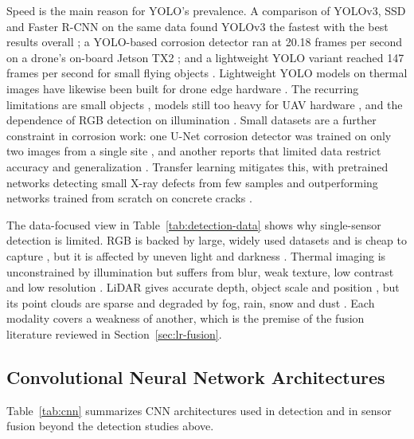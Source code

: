 Speed is the main reason for YOLO's prevalence. A comparison of YOLOv3, SSD and
Faster R-CNN on the same data found YOLOv3 the fastest with the best results
overall \citep{Srivastava2021}; a YOLO-based corrosion detector ran at 20.18 frames per second on
a drone's on-board Jetson TX2 \citep{Yu2023}; and a lightweight YOLO variant reached 147
frames per second for small flying objects \citep{Tao2021}. Lightweight YOLO models on
thermal images have likewise been built for drone edge hardware \citep{Liu2026c,Wang2024b,Wen2025}.
The recurring limitations are small objects \citep{Zhang2024,Srivastava2021,Chen2025}, models still too
heavy for UAV hardware \citep{Jiang2025,Sun2023}, and the dependence of RGB detection on
illumination \citep{Zhang2024,Lalitha2022,Wu2023,Wu2026}. Small datasets are a further constraint in
corrosion work: one U-Net corrosion detector was trained on only two images from
a single site \citep{Suzuki2026}, and another reports that limited data restrict accuracy and
generalization \citep{Hu2023}. Transfer learning mitigates this, with pretrained networks
detecting small X-ray defects from few samples \citep{Gong2022} and outperforming networks
trained from scratch on concrete cracks \citep{Su2024}.

The data-focused view in Table~\ref{tab:detection-data} shows why single-sensor
detection is limited. RGB is backed by large, widely used datasets
\citep{Zhang2024,Srivastava2021} and is cheap to capture \citep{Suzuki2026}, but it is affected by uneven light and darkness \citep{Zhang2024,Lalitha2022,Wu2023,Wu2026}.
Thermal imaging is unconstrained by illumination \citep{Liu2026c,Wen2025} but suffers from
blur, weak texture, low contrast and low resolution \citep{Liu2026c,Wang2024b,Wen2025}. LiDAR gives
accurate depth, object scale and position \citep{Naich2024,Prasanth2026,Soumya2026}, but its point clouds
are sparse \citep{Prasanth2026} and degraded by fog, rain, snow and dust \citep{Naich2024,Soumya2026}. Each
modality covers a weakness of another, which is the premise of the fusion
literature reviewed in Section~\ref{sec:lr-fusion}.

\subsection{Convolutional Neural Network Architectures}

Table~\ref{tab:cnn} summarizes CNN architectures used in detection and in
sensor fusion beyond the detection studies above.


